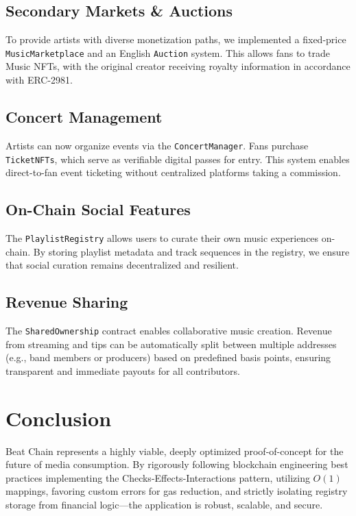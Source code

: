 \documentclass[11pt,a4paper]{article}
\begin{document}
\subsection{Secondary Markets \& Auctions}
To provide artists with diverse monetization paths, we implemented a fixed-price \texttt{MusicMarketplace} and an English \texttt{Auction} system. This allows fans to trade Music NFTs, with the original creator receiving royalty information in accordance with ERC-2981.

\subsection{Concert Management}
Artists can now organize events via the \texttt{ConcertManager}. Fans purchase \texttt{TicketNFTs}, which serve as verifiable digital passes for entry. This system enables direct-to-fan event ticketing without centralized platforms taking a commission.

\subsection{On-Chain Social Features}
The \texttt{PlaylistRegistry} allows users to curate their own music experiences on-chain. By storing playlist metadata and track sequences in the registry, we ensure that social curation remains decentralized and resilient.

\subsection{Revenue Sharing}
The \texttt{SharedOwnership} contract enables collaborative music creation. Revenue from streaming and tips can be automatically split between multiple addresses (e.g., band members or producers) based on predefined basis points, ensuring transparent and immediate payouts for all contributors.

\section{Conclusion}
Beat Chain represents a highly viable, deeply optimized proof-of-concept for the future of media consumption. By rigorously following blockchain engineering best practices implementing the Checks-Effects-Interactions pattern, utilizing $O(1)$ mappings, favoring custom errors for gas reduction, and strictly isolating registry storage from financial logic—the application is robust, scalable, and secure.
\end{document}
